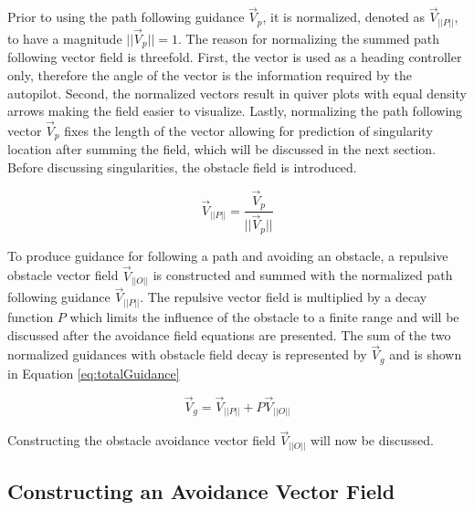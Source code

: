 \documentclass[numbered,pdftex]{ohio-etd}
\begin{document}
Prior to using the path following guidance $\overrightarrow{V}_p$, it is normalized, denoted as $\overrightarrow{V}_{||P||}$, to have a magnitude $||\overrightarrow{V}_p|| = 1$. The reason for normalizing the summed path following vector field is threefold. First, the vector is used as a heading controller only, therefore the angle of the vector is the information required by the autopilot. Second, the normalized vectors result in quiver plots with equal density arrows making the field easier to visualize. Lastly, normalizing the path following vector $\overrightarrow{V}_p$ fixes the length of the vector allowing for prediction of singularity location after summing the field, which will be discussed in the next section. Before discussing singularities, the obstacle field is introduced. 


\begin{equation}
\overrightarrow{V}_{||P||} = \frac{\overrightarrow{V}_p}{||\overrightarrow{V}_p||}
\label{gonAllCompNormalized}
\end{equation}

To produce guidance for following a path and avoiding an obstacle, a repulsive obstacle vector field $\overrightarrow{V}_{||O||}$ is constructed and summed with the normalized path following guidance $\overrightarrow{V}_{||P||}$. The repulsive vector field is multiplied by a decay function $P$ which limits the influence of the obstacle to a finite range and will be discussed after the avoidance field equations are presented. The sum of the two normalized guidances with obstacle field decay is represented by $\overrightarrow{V}_g$ and is shown in Equation \ref{eq:totalGuidance}


\begin{equation}
\label{eq:totalGuidance}
\overrightarrow{V}_g = \overrightarrow{V}_{||P||} + P\overrightarrow{V}_{||O||}
\end{equation}

\noindent
Constructing the obstacle avoidance vector field $\overrightarrow{V}_{||O||}$ will now be discussed.

\subsection{Constructing an Avoidance Vector Field}
\end{document}
